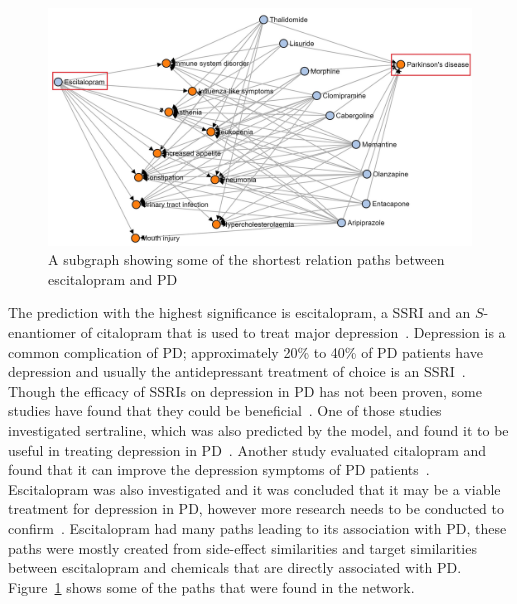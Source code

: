\begin{figure}[!hb]
    \centering
    \includegraphics[scale=0.6]
    {figures/parkinson_escitalopram.jpg}
    \captionsetup{justification=centering}
    \caption [Escitalopram path subgraph in Parkinson's disease]{\label{fig:parkinson_escitalopram} A subgraph showing some of the shortest relation paths between escitalopram and \ac{PD}}
\end{figure}

The prediction with the highest significance is escitalopram, a \ac{SSRI} and an $S$-enantiomer of citalopram that is used to treat major depression~\cite{weintraub_escitalopram_2006}.
Depression is a common complication of \ac{PD}; approximately 20\% to 40\% of \ac{PD} patients have depression and usually the antidepressant treatment of choice is an \ac{SSRI}~\cite{weintraub_escitalopram_2006}.
Though the efficacy of \ac{SSRI}s on depression in \ac{PD} has not been proven, some studies have found that they could be beneficial~\cite{rampello_ssri_2002, hauser_sertraline_1997, ceravolo_paroxetine_2000, menza_citalopram_2004}.
One of those studies investigated sertraline, which was also predicted by the model, and found it to be useful in treating depression in \ac{PD}~\cite{hauser_sertraline_1997}.
Another study evaluated citalopram and found that it can improve the depression symptoms of \ac{PD} patients~\cite{menza_citalopram_2004}.
Escitalopram was also investigated and it was concluded that it may be a viable treatment for depression in \ac{PD}, however more research needs to be conducted to confirm~\cite{weintraub_escitalopram_2006, verma_efficacy_2012}.
Escitalopram had many paths leading to its association with \ac{PD}, these paths were mostly created from side-effect similarities and target similarities between escitalopram and chemicals that are directly associated with \ac{PD}.
Figure~\ref{fig:parkinson_escitalopram} shows some of the paths that were found in the network.

